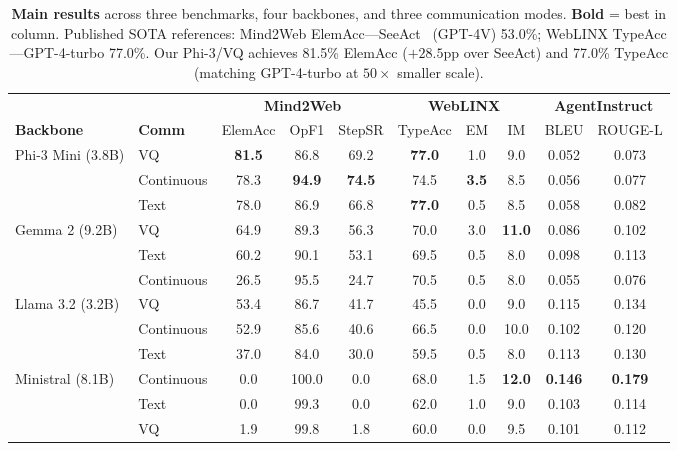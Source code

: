 \documentclass{article}
\newcommand{\best}[1]{\textbf{#1}}
\begin{document}
\begin{table}[t]
\centering
\caption{\textbf{Main results} across three benchmarks, four backbones, and three communication modes.
\textbf{Bold} = best in column.  Published SOTA references: Mind2Web ElemAcc---SeeAct~\cite{zheng2024seeact} (GPT-4V) 53.0\%; WebLINX TypeAcc---GPT-4-turbo 77.0\%.  Our Phi-3/VQ achieves 81.5\% ElemAcc ($+28.5$pp over SeeAct) and 77.0\% TypeAcc (matching GPT-4-turbo at $50\times$ smaller scale).}
\label{tab:main_results}
\small
\begin{tabular}{ll ccc ccc cc}
\toprule
& & \multicolumn{3}{c}{\textbf{Mind2Web}} & \multicolumn{3}{c}{\textbf{WebLINX}} & \multicolumn{2}{c}{\textbf{AgentInstruct}} \\
\cmidrule(lr){3-5} \cmidrule(lr){6-8} \cmidrule(lr){9-10}
\textbf{Backbone} & \textbf{Comm} & ElemAcc & OpF1 & StepSR & TypeAcc & EM & IM & BLEU & ROUGE-L \\
\midrule
\multirow{3}{*}{Phi-3 Mini (3.8B)}
& VQ         & \best{81.5} & 86.8 & 69.2 & \best{77.0} & 1.0 & 9.0 & 0.052 & 0.073 \\
& Continuous & 78.3 & \best{94.9} & \best{74.5} & 74.5 & \best{3.5} & 8.5 & 0.056 & 0.077 \\
& Text       & 78.0 & 86.9 & 66.8 & \best{77.0} & 0.5 & 8.5 & 0.058 & 0.082 \\
\midrule
\multirow{3}{*}{Gemma 2 (9.2B)}
& VQ         & 64.9 & 89.3 & 56.3 & 70.0 & 3.0 & \best{11.0} & 0.086 & 0.102 \\
& Text       & 60.2 & 90.1 & 53.1 & 69.5 & 0.5 & 8.0 & 0.098 & 0.113 \\
& Continuous & 26.5 & 95.5 & 24.7 & 70.5 & 0.5 & 8.0 & 0.055 & 0.076 \\
\midrule
\multirow{3}{*}{Llama 3.2 (3.2B)}
& VQ         & 53.4 & 86.7 & 41.7 & 45.5 & 0.0 & 9.0 & 0.115 & 0.134 \\
& Continuous & 52.9 & 85.6 & 40.6 & 66.5 & 0.0 & 10.0 & 0.102 & 0.120 \\
& Text       & 37.0 & 84.0 & 30.0 & 59.5 & 0.5 & 8.0 & 0.113 & 0.130 \\
\midrule
\multirow{3}{*}{Ministral (8.1B)}
& Continuous & 0.0 & 100.0 & 0.0 & 68.0 & 1.5 & \best{12.0} & \best{0.146} & \best{0.179} \\
& Text       & 0.0 & 99.3 & 0.0 & 62.0 & 1.0 & 9.0 & 0.103 & 0.114 \\
& VQ         & 1.9 & 99.8 & 1.8 & 60.0 & 0.0 & 9.5 & 0.101 & 0.112 \\
\bottomrule
\end{tabular}
\end{table}
\end{document}
